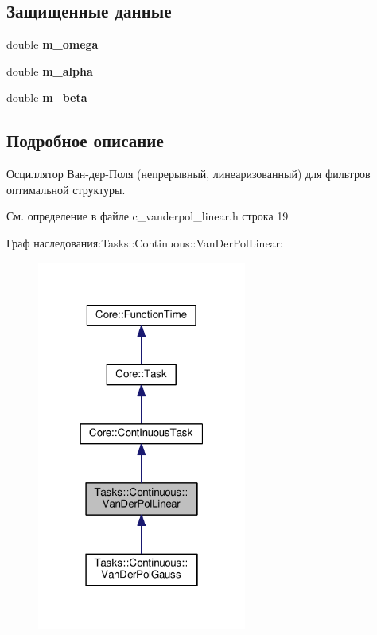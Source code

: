 \subsection*{Защищенные данные}
\begin{DoxyCompactItemize}
\item 
double {\bfseries m\+\_\+omega}\hypertarget{class_tasks_1_1_continuous_1_1_van_der_pol_linear_a32bc8a8ea2d48bbee7cb368511d19bc5}{}\label{class_tasks_1_1_continuous_1_1_van_der_pol_linear_a32bc8a8ea2d48bbee7cb368511d19bc5}

\item 
double {\bfseries m\+\_\+alpha}\hypertarget{class_tasks_1_1_continuous_1_1_van_der_pol_linear_a1054e1ea7e2459ac378fddb763077226}{}\label{class_tasks_1_1_continuous_1_1_van_der_pol_linear_a1054e1ea7e2459ac378fddb763077226}

\item 
double {\bfseries m\+\_\+beta}\hypertarget{class_tasks_1_1_continuous_1_1_van_der_pol_linear_adf8894890b4e4a7d05c450ce145d69b9}{}\label{class_tasks_1_1_continuous_1_1_van_der_pol_linear_adf8894890b4e4a7d05c450ce145d69b9}

\end{DoxyCompactItemize}


\subsection{Подробное описание}
Осциллятор Ван-\/дер-\/Поля (непрерывный, линеаризованный) для фильтров оптимальной структуры. 

См. определение в файле c\+\_\+vanderpol\+\_\+linear.\+h строка 19



Граф наследования\+:Tasks\+:\+:Continuous\+:\+:Van\+Der\+Pol\+Linear\+:
\nopagebreak
\begin{figure}[H]
\begin{center}
\leavevmode
\includegraphics[width=195pt]{class_tasks_1_1_continuous_1_1_van_der_pol_linear__inherit__graph}
\end{center}
\end{figure}


